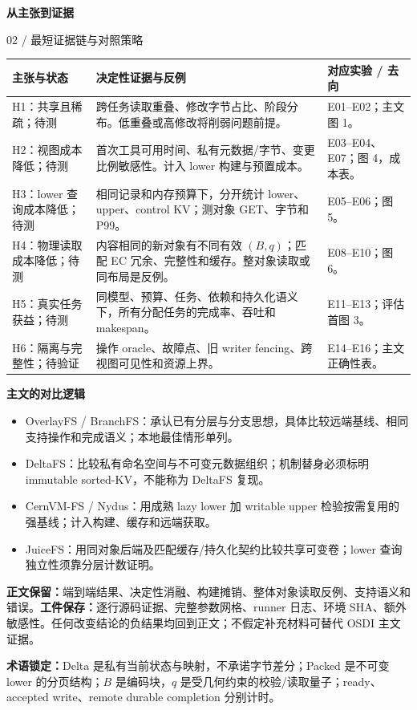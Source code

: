 \documentclass[UTF8,fontset=fandol,11pt]{ctexart}
\newcommand{\head}[2]{\textcolor{accent}{\Large\bfseries #1}\par\textcolor{accent}{#2}\par\medskip}
\begin{document}
\newpage
\head{从主张到证据}{02 / 最短证据链与对照策略}
\small
\begin{tabularx}{\linewidth}{@{}p{2.5cm}Yp{3.6cm}@{}}
\toprule 主张与状态 & 决定性证据与反例 & 对应实验 / 去向\\\midrule
H1：共享且稀疏；待测 & 跨任务读取重叠、修改字节占比、阶段分布。低重叠或高修改将削弱问题前提。 & E01--E02；主文图 1。\\
H2：视图成本降低；待测 & 首次工具可用时间、私有元数据/字节、变更比例敏感性。计入 lower 构建与预置成本。 & E03--E04、E07；图 4，成本表。\\
H3：lower 查询成本降低；待测 & 相同记录和内存预算下，分开统计 lower、upper、control KV；测对象 GET、字节和 P99。 & E05--E06；图 5。\\
H4：物理读取成本降低；待测 & 内容相同的新对象有不同有效 $(B,q)$；匹配 EC 冗余、完整性和缓存。整对象读取或同布局是反例。 & E08--E10；图 6。\\
H5：真实任务获益；待测 & 同模型、预算、任务、依赖和持久化语义下，所有分配任务的完成率、吞吐和 makespan。 & E11--E13；评估首图 3。\\
H6：隔离与完整性；待验证 & 操作 oracle、故障点、旧 writer fencing、跨视图可见性和资源上界。 & E14--E16；主文正确性表。\\\bottomrule
\end{tabularx}
\normalsize

\textbf{主文的对比逻辑}
\begin{itemize}
\item OverlayFS / BranchFS：承认已有分层与分支思想，具体比较远端基线、相同支持操作和完成语义；本地最佳情形单列。
\item DeltaFS：比较私有命名空间与不可变元数据组织；机制替身必须标明 immutable sorted-KV，不能称为 DeltaFS 复现。
\item CernVM-FS / Nydus：用成熟 lazy lower 加 writable upper 检验按需复用的强基线；计入构建、缓存和远端获取。
\item JuiceFS：用同对象后端及匹配缓存/持久化契约比较共享可变卷；lower 查询独立性须靠分层计数证明。
\end{itemize}

\textbf{正文保留：}端到端结果、决定性消融、构建摊销、整体对象读取反例、支持语义和错误。\textbf{工件保存：}逐行源码证据、完整参数网格、runner 日志、环境 SHA、额外敏感性。任何改变结论的负结果均回到正文；不假定补充材料可替代 OSDI 主文证据。

\textbf{术语锁定：}Delta 是私有当前状态与映射，不承诺字节差分；Packed 是不可变 lower 的分页结构；$B$ 是编码块，$q$ 是受几何约束的校验/读取量子；ready、accepted write、remote durable completion 分别计时。
\end{document}
